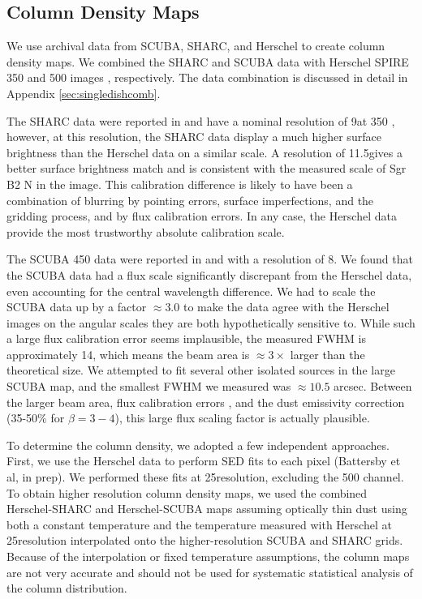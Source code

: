 \documentclass[twocolumn]{aastex61}
\newcommand{\percent}{\%\xspace}
\begin{document}
\subsection{Column Density Maps}
We use archival data from SCUBA, SHARC, and Herschel to create column density
maps.  We combined the SHARC and SCUBA data with Herschel SPIRE 350 and 500 \um
images \citep{Molinari2010a}, respectively.  The data combination is discussed
in detail in Appendix \ref{sec:singledishcomb}.  

The SHARC data were reported in \citet{Bally2010a} and have a nominal
resolution of 9\arcsec at 350 \um, however, at this resolution,
the SHARC data display a much higher surface brightness than the Herschel
data on a similar scale.  A resolution of 11.5\arcsec gives a better
surface brightness match and is consistent with the measured scale of Sgr
B2 N in the image.  This calibration difference is likely to have been a
combination of blurring by pointing errors, surface imperfections, and
the gridding process, and by flux calibration errors.  In any case, the
Herschel data provide the most trustworthy absolute calibration scale.

The SCUBA 450 \um data were reported in \citet{Pierce-Price2000a} and
\citet{di-Francesco2008a} with a resolution of 8\arcsec.  We found that the
SCUBA data had a flux scale significantly discrepant from the Herschel data,
even accounting for the central wavelength difference.  We had to scale the
SCUBA data up by a factor $\approx3.0$ to make the data agree with the Herschel
images on the angular scales they are both hypothetically sensitive to.
While such a large flux calibration error seems implausible, the measured
FWHM is approximately 14\arcsec, which means the beam area is $\approx3\times$
larger than the theoretical size.  We attempted to fit several other isolated
sources in the large SCUBA map, and the smallest FWHM we measured was $\approx10.5$
arcsec.  Between the larger beam area, flux calibration errors \citep[quoted at
20\percent in][]{Pierce-Price2000a}, and the dust emissivity correction
(35-50\percent for $\beta=3-4$), this large flux scaling factor is actually
plausible.  


To determine the column density, we adopted a few independent approaches.
First, we use the Herschel data to perform SED fits to each pixel (Battersby et
al, in prep).  We performed these fits at 25\arcsec resolution, excluding the
500 \um channel.  To obtain higher resolution column density maps, we used the
combined Herschel-SHARC and Herschel-SCUBA maps assuming optically thin dust
using both a constant temperature and the temperature measured with Herschel at
25\arcsec resolution interpolated onto the higher-resolution SCUBA and SHARC
grids.  Because of the interpolation or fixed temperature assumptions, the
column maps are not very accurate and should not be used for systematic
statistical analysis of the column distribution.
\end{document}
